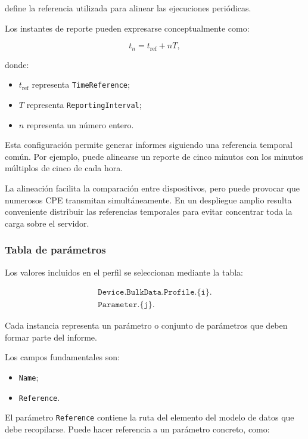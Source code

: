 define la referencia utilizada para alinear las ejecuciones periódicas.

Los instantes de reporte pueden expresarse conceptualmente como:

\[
    t_n =
    t_{\mathrm{ref}}
    +
    nT,
\]

donde:

\begin{itemize}
    \item \(t_{\mathrm{ref}}\) representa
    \texttt{TimeReference};

    \item \(T\) representa \texttt{ReportingInterval};

    \item \(n\) representa un número entero.
\end{itemize}

Esta configuración permite generar informes siguiendo una referencia
temporal común. Por ejemplo, puede alinearse un reporte de cinco minutos
con los minutos múltiplos de cinco de cada hora.

La alineación facilita la comparación entre dispositivos, pero puede
provocar que numerosos CPE transmitan simultáneamente. En un despliegue
amplio resulta conveniente distribuir las referencias temporales para
evitar concentrar toda la carga sobre el servidor.


\subsubsection*{Tabla de parámetros}

Los valores incluidos en el perfil se seleccionan mediante la tabla:

\[
\begin{split}
    \texttt{Device.BulkData.Profile.\{i\}.}\\
    \texttt{Parameter.\{j\}.}
\end{split}
\]

Cada instancia representa un parámetro o conjunto de parámetros que deben
formar parte del informe.

Los campos fundamentales son:

\begin{itemize}
    \item \texttt{Name};
    \item \texttt{Reference}.
\end{itemize}

El parámetro \texttt{Reference} contiene la ruta del elemento del modelo
de datos que debe recopilarse. Puede hacer referencia a un parámetro
concreto, como:

